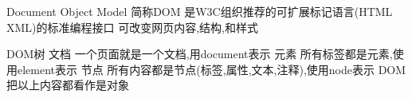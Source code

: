 Document Object Model 简称DOM 是W3C组织推荐的可扩展标记语言(HTML XML)的标准编程接口
可改变网页内容,结构,和样式

DOM树
文档 一个页面就是一个文档,用document表示
元素 所有标签都是元素,使用element表示
节点 所有内容都是节点(标签,属性,文本,注释),使用node表示
DOM把以上内容都看作是对象